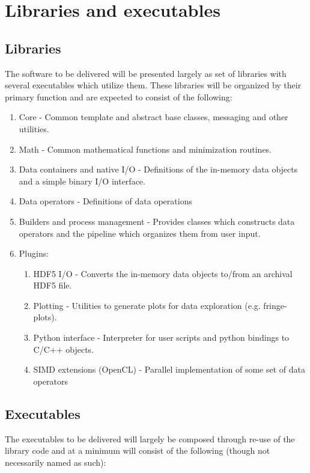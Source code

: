\documentclass[hidelinks]{article}
\let\Oldsection\section
\renewcommand{\section}{\FloatBarrier\Oldsection}
\let\Oldsubsection\subsection
\renewcommand{\subsection}{\FloatBarrier\Oldsubsection}
\begin{document}
\section{Libraries and executables}

\subsection{Libraries}

The software to be delivered will be presented largely as set of libraries with several executables which utilize them. These libraries will be organized by their primary function and are expected to consist of the following:

\begin{enumerate}
 \item Core - Common template and abstract base classes, messaging and other utilities.
 \item Math - Common mathematical functions and minimization routines.
 \item Data containers and native I/O - Definitions of the in-memory data objects and a simple binary I/O interface. 
 \item Data operators - Definitions of data operations 
 \item Builders and process management - Provides classes which constructs data operators and the pipeline which organizes them from user input.
 \item Plugins:
 \begin{enumerate}
    \item HDF5 I/O - Converts the in-memory data objects to/from an archival HDF5 file.
    \item Plotting - Utilities to generate plots for data exploration (e.g. fringe-plots).
    \item Python interface - Interpreter for user scripts and python bindings to C/C++ objects.
    \item SIMD extensions (OpenCL) - Parallel implementation of some set of data operators
 \end{enumerate}
\end{enumerate}


\subsection{Executables}

The executables to be delivered will largely be composed through re-use of the library code and at a minimum will consist of the following (though not necessarily
named as such):
\end{document}
